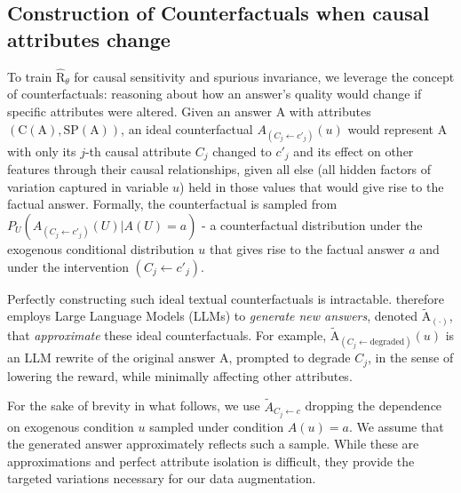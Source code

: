 \subsection{Construction of Counterfactuals when causal attributes change}
\label{subsec:approximating_counterfactuals}

\vspace{-0.05in}
{\color{blue}
To train $\hat{\mathrm{R}}_\theta$ for causal sensitivity and spurious invariance, we leverage the concept of counterfactuals: reasoning about how an answer's quality would change if specific attributes were altered. Given an answer $\mathrm{A}$ with attributes $(\mathrm{C}(\mathrm{A}), \mathrm{SP}(\mathrm{A}))$, an ideal counterfactual $A_{(C_j \leftarrow c'_j)} (u)$ would represent $\mathrm{A}$ with only its $j$-th causal attribute $C_j$ changed to $c'_j$ and its effect on other features through their causal relationships, given all else (all hidden factors of variation captured in variable $u$) held in those values that would give rise to the factual answer. Formally, the counterfactual is sampled from $P_{U}(A_{(C_j \leftarrow c'_j)} (U) | A(U) =a)$ - a counterfactual distribution under the exogenous conditional distribution $u$ that gives rise to the factual answer $a$ and under the intervention $(C_j \leftarrow c'_j)$.

Perfectly constructing such ideal textual counterfactuals is intractable. \carma{} therefore employs Large Language Models (LLMs) to \textit{generate new answers}, denoted $\tilde{\mathrm{A}}_{(\cdot)}$, that \textit{approximate} these ideal counterfactuals. For example, $\tilde{\mathrm{A}}_{(C_j \leftarrow \text{degraded})}(u)$ is an LLM rewrite of the original answer $\mathrm{A}$, prompted to degrade $C_j$, in the sense of lowering the reward, while minimally affecting other attributes. }

{\color{blue}
\begin{remark} For the sake of brevity in what follows, we use $\tilde{A}_{C_j \leftarrow c}$ dropping the dependence on exogenous condition $u$ sampled under condition $A(u) = a$. We assume that the generated answer approximately reflects such a sample. While these are approximations and perfect attribute isolation is difficult, they provide the targeted variations necessary for our data augmentation.
\end{remark}
}

